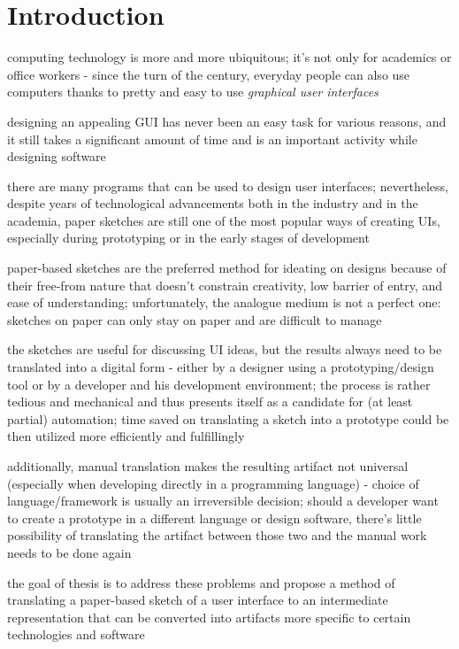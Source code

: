 \section{Introduction}\label{sec:introduction}


computing technology is more and more ubiquitous; it's not only for academics
or office workers - since the turn of the century, everyday people can also use
computers thanks to pretty and easy to use
\emph{graphical user interfaces} 

designing an appealing GUI has never been an easy task for various reasons,
and it still takes a significant amount of time 
and is an important activity while designing software

there are many programs that can be used to design user interfaces;
nevertheless, despite years of technological advancements
both in the industry and in the academia, paper sketches are still
one of the most popular  ways of creating UIs, especially during prototyping
or in the early stages of development

paper-based sketches are the preferred method for ideating on designs
because of their free-from nature that doesn't constrain creativity,
low barrier of entry, and ease of understanding;
unfortunately, the analogue medium is not a perfect one: sketches on paper
can only stay on paper and are difficult to manage 

the sketches are useful for discussing UI ideas, but the results
always need to be translated into a digital form - either by a designer using a prototyping/design tool or by a developer and his development environment;
the process is rather tedious and mechanical  and thus presents itself
as a candidate for (at least partial) automation;
time saved on translating a sketch into a prototype
could be then utilized more efficiently and fulfillingly

additionally, manual translation makes the resulting artifact not universal
(especially when developing directly in a programming language)
- choice of language/framework is usually an irreversible decision;
should a developer want to create a prototype in a different language
or design software, there's little possibility of translating the artifact
between those two and the manual work needs to be done again

the goal of thesis is to address these problems and propose a method
of translating a paper-based sketch of a user interface
to an intermediate representation that can be converted into artifacts
more specific to certain technologies and software

